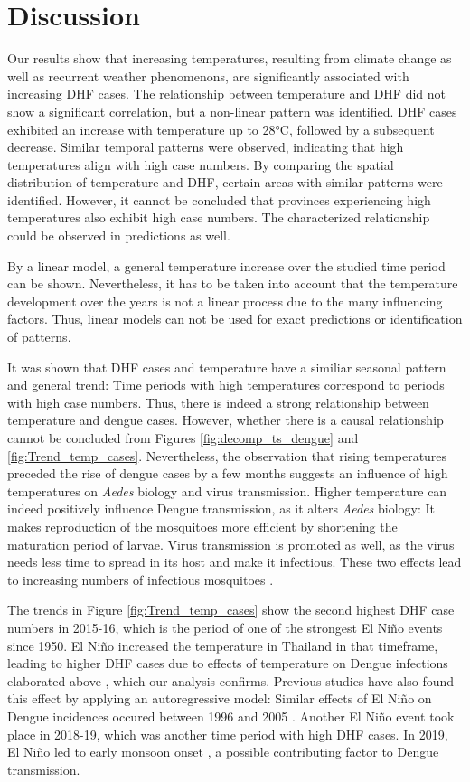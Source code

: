 \section{Discussion}
Our results show that increasing temperatures, resulting from climate change as well as recurrent weather phenomenons, are significantly associated with increasing DHF cases.
The relationship between temperature and DHF did not show a significant correlation, but a non-linear pattern was identified. DHF cases exhibited an increase with temperature up to 28°C, followed by a subsequent decrease. Similar temporal patterns were observed, indicating that high temperatures align with high case numbers. By comparing the spatial distribution of temperature and DHF, certain areas with similar patterns were identified. However, it cannot be concluded that provinces experiencing high temperatures also exhibit high case numbers. 
The characterized relationship could be observed in predictions as well. 

By a linear model, a general temperature increase over the studied time period can be shown. Nevertheless, it has to be taken into account that the temperature development over the years is not a linear process due to the many influencing factors. Thus, linear models can not be used for exact predictions or identification of patterns. 

It was shown that DHF cases and temperature have a similiar seasonal pattern and general trend: Time periods with high temperatures correspond to periods with high case numbers. Thus, there is indeed a strong relationship between temperature and dengue cases. However, whether there is a causal relationship cannot be concluded from Figures \ref{fig:decomp_ts_dengue} and \ref{fig:Trend_temp_cases}. Nevertheless, the observation that rising temperatures preceded the rise of dengue cases by a few months suggests an influence of high temperatures on \emph{Aedes} biology and virus transmission. 
Higher temperature can indeed positively influence Dengue transmission, as it alters \emph{Aedes} biology: It makes reproduction of the mosquitoes more efficient by shortening the maturation period of  larvae. Virus transmission is promoted as well, as the virus needs less time to spread in its host and make it infectious. These two effects lead to increasing numbers of infectious mosquitoes \citep{Anyamba2019}.
 
The trends in Figure \ref{fig:Trend_temp_cases} show the second highest DHF case numbers in 2015-16, which is the period of one of the strongest El Niño events since 1950. El Niño increased the temperature in Thailand in that timeframe, leading to higher DHF cases due to effects of temperature on Dengue infections elaborated above \citep{Anyamba2019}, which our analysis confirms. Previous studies have also found this effect by applying an autoregressive model: Similar effects of El Niño on Dengue incidences occured between 1996 and 2005 \citep{Tipayamongkholgul2009}.
Another El Niño event took place in 2018-19, which was another time period with high DHF cases.  In 2019, El Niño led to early monsoon onset \citep{Hu2020}, a possible contributing factor to Dengue transmission. 


